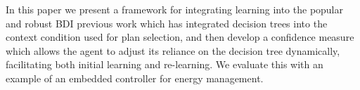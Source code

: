 
In this paper we present a
framework for integrating learning into the popular and robust BDI
previous work which has integrated decision trees into the context
condition used for plan selection, and then develop a confidence
measure which allows the agent to adjust its reliance on the
decision tree dynamically, facilitating both initial learning and
re-learning. We evaluate this with an example of an embedded controller
for energy management.

%
%
%
%

